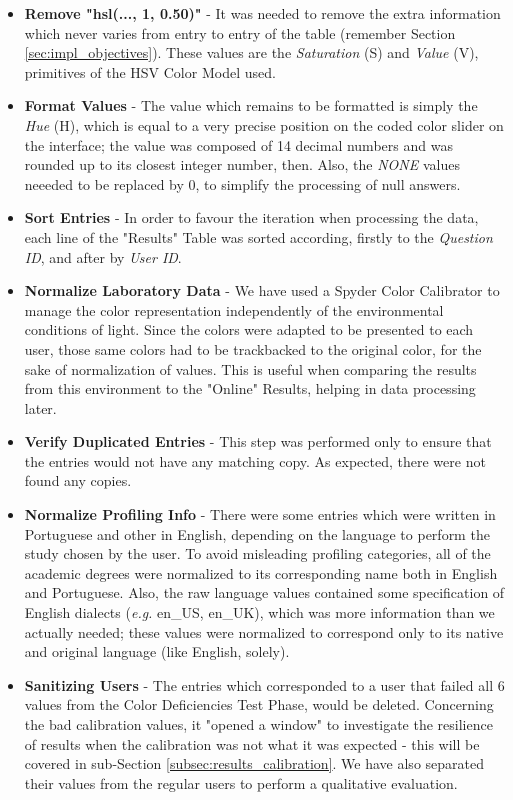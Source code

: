 \begin{itemize}
  \item \textbf{Remove "hsl(..., 1, 0.50)"} - It was needed to remove the extra information which never varies from entry to entry of the table
  (remember Section \ref{sec:impl_objectives}). These values are the \emph{Saturation} (S) and \emph{Value} (V), primitives of the HSV Color Model used.
  \item \textbf{Format Values} - The value which remains to be formatted is simply the \emph{Hue} (H),
  which is equal to a very precise position on the coded color slider on the interface; the value was composed of 14 decimal numbers and
  was rounded up to its closest integer number, then. Also, the \emph{NONE} values neeeded to be replaced by 0, to simplify the processing of null answers.
  \item \textbf{Sort Entries} - In order to favour the iteration when processing the data, each line of the "Results" Table was
  sorted according, firstly to the \emph{Question ID}, and after by \emph{User ID}.
  \item \textbf{Normalize Laboratory Data} - We have used a Spyder Color Calibrator to manage the color representation independently of the environmental
  conditions of light. Since the colors were adapted to be presented to each user, those same colors had to be trackbacked to the original color, for the
  sake of normalization of values. This is useful when comparing the results from this environment to the "Online" Results, helping in data processing later.
  \item \textbf{Verify Duplicated Entries} - This step was performed only to ensure that the entries would not have any matching copy. As expected,
  there were not found any copies.
  \item \textbf{Normalize Profiling Info} - There were some entries which were written in Portuguese and other in English, depending on
  the language to perform the study chosen by the user. To avoid misleading profiling categories, all of the academic degrees were normalized to its corresponding
  name both in English and Portuguese. Also, the raw language values contained some specification of English dialects (\emph{e.g.} en\_US, en\_UK),
  which was more information than we actually needed; these values were normalized to correspond only to its native and original language (like English, solely).
  \item \textbf{Sanitizing Users} - The entries which corresponded to a user that failed all 6 values from the Color Deficiencies Test Phase, would be
  deleted. Concerning the bad calibration values, it "opened a window" to investigate the resilience of results when the
  calibration was not what it was expected - this will be covered in sub-Section \ref{subsec:results_calibration}. We have also separated their values from
  the regular users to perform a qualitative evaluation.
\end{itemize} \par
